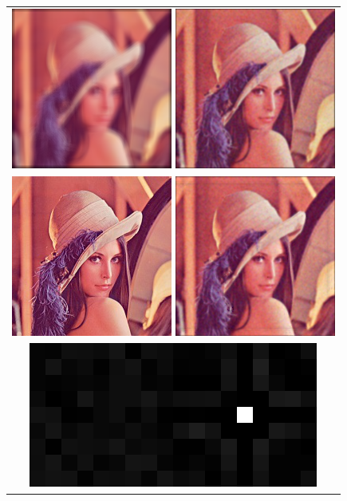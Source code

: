 \documentclass{article}
\begin{document}
\begin{figure}
\begin{center}
	\begin{tabular}{c}	
		\includegraphics[scale=1]{images/blurred_9px.png}
		\includegraphics[scale=1]{images/denoised_9px.png}\\
		\includegraphics[scale=1]{images/original_5px.png}
		\includegraphics[scale=1]{images/estimation_9px.png}\\
		\includegraphics[scale=0.7]{images/kernels_9px.png}

\end{tabular}
\end{center}
\end{figure}
\end{document}
